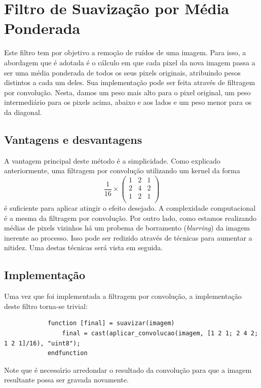 \documentclass[brazil,times]{abnt}
\begin{document}
	
	\section{Filtro de Suavização por Média Ponderada}
		Este filtro tem por objetivo a remoção de ruídos de uma imagem. Para isso, a abordagem que é adotada é o cálculo em que cada pixel da nova imagem passa a ser uma média ponderada de todos os seus pixels originais, atribuindo pesos distintos a cada um deles. Sua implementação pode ser feita através de filtragem por convolução. Nesta, damos um peso mais alto para o pixel original, um peso intermediário para os pixels acima, abaixo e aos lados e um peso menor para os da diagonal.
	
		\subsection{Vantagens e desvantagens}
			A vantagem principal deste método é a simplicidade. Como explicado anteriormente, uma filtragem por convolução utilizando um kernel da forma 
\[
 \frac{1}{16} \times 
 \begin{pmatrix}
  1 & 2 & 1 \\
  2 & 4 & 2 \\
  1 & 2 & 1 \\
 \end{pmatrix}
\]
		é suficiente para aplicar atingir o efeito desejado. A complexidade computacional é a mesma da filtragem por convolução. Por outro lado, como estamos realizando médias de pixels vizinhos há um probema de borramento (\emph{blurring}) da imagem inerente ao processo. Isso pode ser redizido através de técnicas para aumentar a nitidez. Uma destas técnicas será vista em seguida.
		
		\subsection{Implementação}
			Uma vez que foi implementada a filtragem por convolução, a implementação deste filtro torna-se trivial:
			
			\begin{lstlisting}
			function [final] = suavizar(imagem)
			    final = cast(aplicar_convolucao(imagem, [1 2 1; 2 4 2; 1 2 1]/16), "uint8");
			endfunction
			\end{lstlisting}
			
			Note que é necessário arredondar o resultado da convolução para que a imagem resultante possa ser gravada novamente.
		
\end{document}
